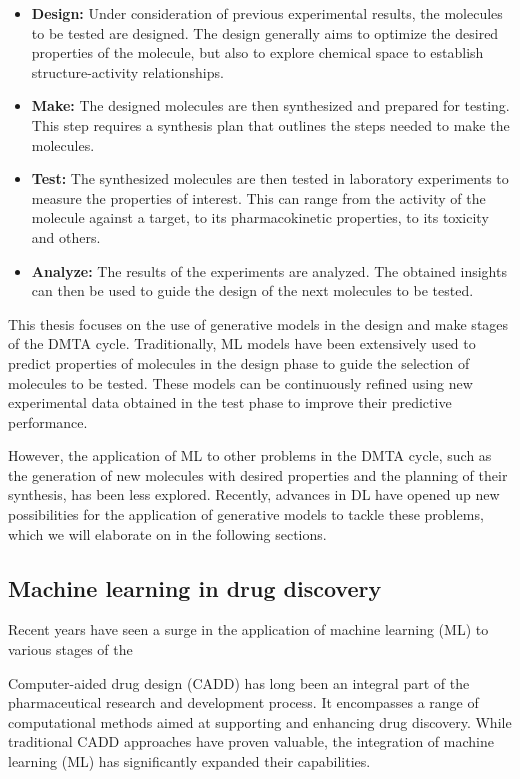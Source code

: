 \begin{itemize}
	\item \textbf{Design:} Under consideration of previous experimental results, the molecules to
	      be tested are designed. The design generally aims to optimize the desired properties of
	      the molecule, but also to explore chemical space to establish structure-activity relationships.
	\item \textbf{Make:} The designed molecules are then synthesized and prepared for testing. This
	      step requires a synthesis plan that outlines the steps needed to make the molecules.
	\item \textbf{Test:} The synthesized molecules are then tested in laboratory experiments to
	      measure the properties of interest. This can range from the activity of the molecule
	      against a target, to its pharmacokinetic properties, to its toxicity and others.
	\item \textbf{Analyze:} The results of the experiments are analyzed. The obtained insights
	      can then be used to guide the design of the next molecules to be tested.
\end{itemize}

This thesis focuses on the use of generative models in the design and make stages of the \ac{DMTA}
cycle. Traditionally, \ac{ML} models have been extensively used to predict properties of molecules
in the design phase to guide the selection of molecules to be tested. These models can be
continuously refined using new experimental data obtained in the test phase to improve their
predictive performance.

However, the application of \ac{ML} to other problems in the \ac{DMTA} cycle, such as the generation
of new molecules with desired properties and the planning of their synthesis, has been less
explored. Recently, advances in \ac{DL} have opened up new possibilities for the application of
generative models to tackle these problems, which we will elaborate on in the following sections.

\subsection{Machine learning in drug discovery}
Recent years have seen a surge in the application of machine learning (ML) to various stages of the

Computer-aided drug design (CADD) has long been an integral part of the pharmaceutical research and
development process. It encompasses a range of computational methods aimed at supporting and
enhancing drug discovery. While traditional CADD approaches have proven valuable, the integration of
machine learning (ML) has significantly expanded their capabilities.

